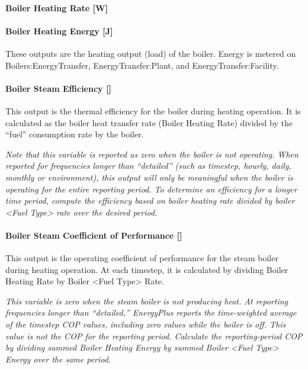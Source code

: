 \paragraph{Boiler Heating Rate {[}W{]}}\label{boiler-heating-rate-w-1}

\paragraph{Boiler Heating Energy {[}J{]}}\label{boiler-heating-energy-j-1}

These outputs are the heating output (load) of the boiler. Energy is metered on Boilers:EnergyTransfer, EnergyTransfer:Plant, and EnergyTransfer:Facility.

\paragraph{Boiler Steam Efficiency {[]}}\label{boiler-steam-efficiency}

This output is the thermal efficiency for the boiler during heating operation. It is calculated as the boiler heat transfer rate (Boiler Heating Rate) divided by the ``fuel'' consumption rate by the boiler.

\emph{Note that this variable is reported as zero when the boiler is not operating. When reported for frequencies longer than ``detailed'' (such as timestep, hourly, daily, monthly or environment), this output will only be meaningful when the boiler is operating for the entire reporting period. To determine an efficiency for a longer time period, compute the efficiency based on boiler heating rate divided by boiler \textless{}Fuel Type\textgreater{} rate over the desired period.}

\paragraph{Boiler Steam Coefficient of Performance {[]}}\label{boiler-steam-coefficient-of-performance}

This output is the operating coefficient of performance for the steam boiler during heating operation. At each timestep, it is calculated by dividing Boiler Heating Rate by Boiler \textless{}Fuel Type\textgreater{} Rate.

\emph{This variable is zero when the steam boiler is not producing heat. At reporting frequencies longer than ``detailed,'' EnergyPlus reports the time-weighted average of the timestep COP values, including zero values while the boiler is off. This value is not the COP for the reporting period. Calculate the reporting-period COP by dividing summed Boiler Heating Energy by summed Boiler \textless{}Fuel Type\textgreater{} Energy over the same period.}

